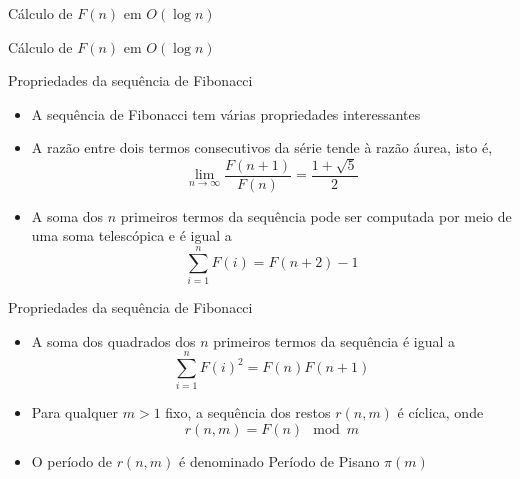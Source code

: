 \begin{frame}[fragile]{Cálculo de $F(n)$ em $O(\log n)$}
\end{frame}

\begin{frame}[fragile]{Cálculo de $F(n)$ em $O(\log n)$}
\end{frame}

\begin{frame}[fragile]{Propriedades da sequência de Fibonacci}

    \begin{itemize}
        \item A sequência de Fibonacci tem várias propriedades interessantes

        \item A razão entre dois termos consecutivos da série tende à razão áurea, isto é,
$$
    \lim_{n\to \infty} \frac{F(n + 1)}{F(n)} = \frac{1 + \sqrt{5}}{2}
$$ 

        \item A soma dos $n$ primeiros termos da sequência pode ser computada por meio de uma soma
            telescópica e é igual a 
$$
    \sum_{i = 1}^n F(i) = F(n + 2) - 1
$$
    \end{itemize}

\end{frame}

\begin{frame}[fragile]{Propriedades da sequência de Fibonacci}

    \begin{itemize}
        \item A soma dos quadrados dos $n$ primeiros termos da sequência é igual a 
$$
    \sum_{i = 1}^n F(i)^2 = F(n)F(n+1)
$$

        \item Para qualquer $m > 1$ fixo, a sequência dos restos $r(n, m)$ é cíclica, onde
$$
r(n, m) = F(n)\!\!\!\! \mod m
$$

        \item O período de $r(n, m)$ é denominado Período de Pisano $\pi(m)$
    \end{itemize}

\end{frame}

